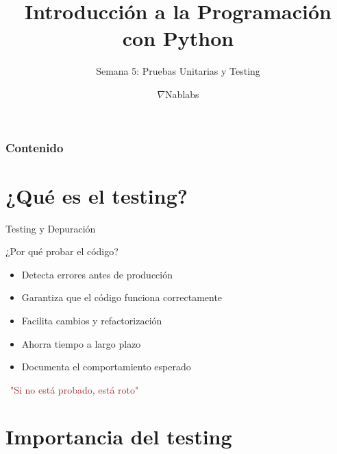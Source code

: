 \documentclass{beamer}
\title{\textbf{Introducción a la Programación con Python}}
\subtitle{Semana 5: Pruebas Unitarias y Testing}
\author{$\nabla$Nablabs}
\date{}
\begin{document}
\begin{frame}
\titlepage
\end{frame}

\begin{frame}
\frametitle{Contenido}
\tableofcontents
\end{frame}

\section{¿Qué es el testing?}

\begin{frame}{Testing y Depuración \faVial}
\begin{conceptbox}{¿Por qué probar el código?}
\small
\begin{itemize}
    \item[\faCheckCircle] Detecta errores antes de producción
    \item[\faShieldAlt] Garantiza que el código funciona correctamente
    \item[\faRecycle] Facilita cambios y refactorización
    \item[\faClock] Ahorra tiempo a largo plazo
    \item[\faFileAlt] Documenta el comportamiento esperado
\end{itemize}
\end{conceptbox}

\vspace{0.2cm}
\begin{center}
\large\textcolor{brown}{\faBug\ "Si no está probado, está roto"}
\end{center}
\end{frame}

\section{Importancia del testing}
\end{document}
